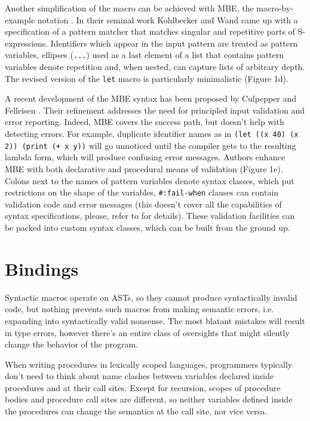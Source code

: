 \documentclass[10pt,journal,a4paper]{IEEEtran}
\begin{document}
Another simplification of the macro can be achieved with MBE, the macro-by-example notation
\cite{kohlbecker87}. In their seminal work Kohlbecker and Wand came up with a specification
of a pattern matcher that matches singular and repetitive parts of S-expressions.
Identifiers which appear in the input pattern are treated as pattern variables,
ellipses (\texttt{...}) used as a last element of a list that contains pattern variables
denote repetition and, when nested, can capture lists of arbitrary depth.
The revised version of the \texttt{let} macro is particularly minimalistic (Figure 1d).

A recent development of the MBE syntax has been proposed by Culpepper and Felleisen \cite{culpepper10}.
Their refinement addresses the need for principled input validation and error reporting. Indeed,
MBE covers the success path, but doesn't help with detecting errors. For example,
duplicate identifier names as in \texttt{(let ((x 40) (x 2)) (print (+ x y))} will go
unnoticed until the compiler gets to the resulting lambda form, which will produce
confusing error messages. Authors enhance MBE with both declarative and procedural
means of validation (Figure 1e). Colons next to the names of pattern variables denote syntax classes,
which put restrictions on the shape of the variables, \texttt{\#:fail-when} clauses can contain
validation code and error messages (this doesn't cover all the capabilities of syntax specifications,
please, refer to \cite{culpepper10} for details). These validation facilities can be packed
into custom syntax classes, which can be built from the ground up.

\section{Bindings}

Syntactic macros operate on ASTs, so they cannot produce syntactically invalid code,
but nothing prevents such macros from making semantic errors, i.e. expanding into
syntactically valid nonsense.
The most blatant mistakes will result in type errors, however there's an entire class
of oversights that might silently change the behavior of the program.

When writing procedures in lexically scoped languages, programmers typically don't need to think
about name clashes between variables declared inside procedures and at their call sites.
Except for recursion, scopes of procedure bodies and procedure call sites are different, so
neither variables defined inside the procedures can change the semantics at the call site, nor vice versa.
\end{document}
